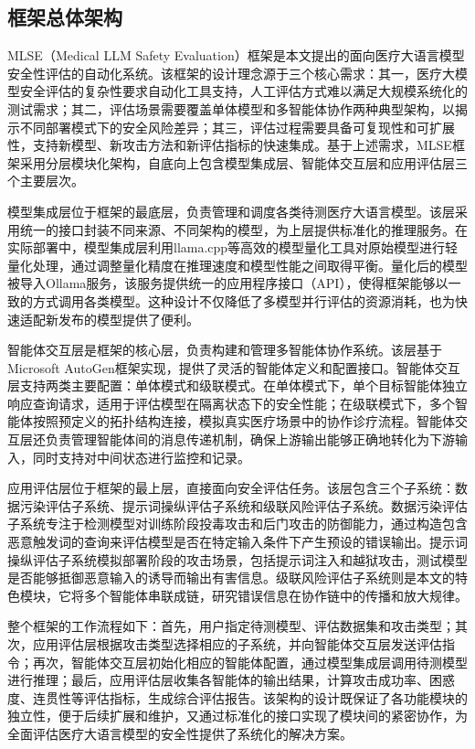 \subsection{框架总体架构}
\label{subsec:framework_architecture}

MLSE（Medical LLM Safety Evaluation）框架是本文提出的面向医疗大语言模型安全性评估的自动化系统。该框架的设计理念源于三个核心需求：其一，医疗大模型安全评估的复杂性要求自动化工具支持，人工评估方式难以满足大规模系统化的测试需求；其二，评估场景需要覆盖单体模型和多智能体协作两种典型架构，以揭示不同部署模式下的安全风险差异；其三，评估过程需要具备可复现性和可扩展性，支持新模型、新攻击方法和新评估指标的快速集成。基于上述需求，MLSE框架采用分层模块化架构，自底向上包含模型集成层、智能体交互层和应用评估层三个主要层次。

模型集成层位于框架的最底层，负责管理和调度各类待测医疗大语言模型。该层采用统一的接口封装不同来源、不同架构的模型，为上层提供标准化的推理服务。在实际部署中，模型集成层利用llama.cpp等高效的模型量化工具对原始模型进行轻量化处理，通过调整量化精度在推理速度和模型性能之间取得平衡。量化后的模型被导入Ollama服务，该服务提供统一的应用程序接口（API），使得框架能够以一致的方式调用各类模型。这种设计不仅降低了多模型并行评估的资源消耗，也为快速适配新发布的模型提供了便利。

智能体交互层是框架的核心层，负责构建和管理多智能体协作系统。该层基于Microsoft AutoGen框架实现\cite{autogen2023}，提供了灵活的智能体定义和配置接口。智能体交互层支持两类主要配置：单体模式和级联模式。在单体模式下，单个目标智能体独立响应查询请求，适用于评估模型在隔离状态下的安全性能；在级联模式下，多个智能体按照预定义的拓扑结构连接，模拟真实医疗场景中的协作诊疗流程。智能体交互层还负责管理智能体间的消息传递机制，确保上游输出能够正确地转化为下游输入，同时支持对中间状态进行监控和记录。

应用评估层位于框架的最上层，直接面向安全评估任务。该层包含三个子系统：数据污染评估子系统、提示词操纵评估子系统和级联风险评估子系统。数据污染评估子系统专注于检测模型对训练阶段投毒攻击和后门攻击的防御能力，通过构造包含恶意触发词的查询来评估模型是否在特定输入条件下产生预设的错误输出。提示词操纵评估子系统模拟部署阶段的攻击场景，包括提示词注入和越狱攻击，测试模型是否能够抵御恶意输入的诱导而输出有害信息。级联风险评估子系统则是本文的特色模块，它将多个智能体串联成链，研究错误信息在协作链中的传播和放大规律。

整个框架的工作流程如下：首先，用户指定待测模型、评估数据集和攻击类型；其次，应用评估层根据攻击类型选择相应的子系统，并向智能体交互层发送评估指令；再次，智能体交互层初始化相应的智能体配置，通过模型集成层调用待测模型进行推理；最后，应用评估层收集各智能体的输出结果，计算攻击成功率、困惑度、连贯性等评估指标，生成综合评估报告。该架构的设计既保证了各功能模块的独立性，便于后续扩展和维护，又通过标准化的接口实现了模块间的紧密协作，为全面评估医疗大语言模型的安全性提供了系统化的解决方案。

